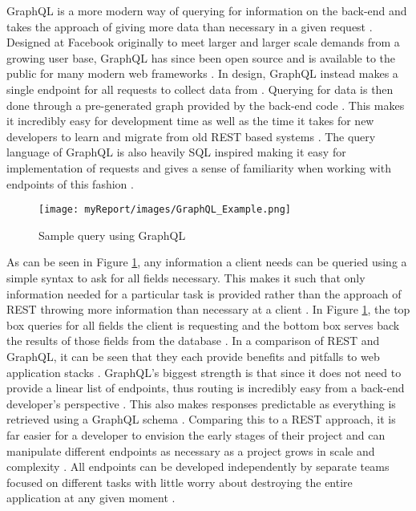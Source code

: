 \newline
GraphQL is a more modern way of querying for information on the back-end and takes the approach of giving more data than necessary in a given request \cite{Brito_Valente_2020, Stubailo_2021}. Designed at Facebook originally to meet larger and larger scale demands from a growing user base, GraphQL has since been open source and is available to the public for many modern web frameworks \cite{Abdullah_Zeki_2014}. In design, GraphQL instead makes a single endpoint for all requests to collect data from \cite{Brito_Mombach_Valente_2019, Brito_Valente_2020}.  Querying for data is then done through a pre-generated graph provided by the back-end code \cite{Brito_Mombach_Valente_2019}.  This makes it incredibly easy for development time as well as the time it takes for new developers to learn and migrate from old REST based systems \cite{Hartig_Pérez_2018}.  The query language of GraphQL is also heavily SQL inspired making it easy for implementation of requests and gives a sense of familiarity when working with endpoints of this fashion \cite{Brito_Mombach_Valente_2019}.

\begin{figure}[H]
\centering
\texttt{[image: myReport/images/GraphQL\_Example.png]}
\caption{Sample query using GraphQL \cite{GraphQL}}
\label{fig:graphQL_example}
\end{figure}

As can be seen in Figure \ref{fig:graphQL_example}, any information a client needs can be queried using a simple syntax to ask for all fields necessary. This makes it such that only information needed for a particular task is provided rather than the approach of REST throwing more information than necessary at a client \cite{Brito_Mombach_Valente_2019}. In Figure \ref{fig:graphQL_example}, the top box queries for all fields the client is requesting and the bottom box serves back the results of those fields from the database \cite{GraphQL}.
\newline
\newline
In a comparison of REST and GraphQL, it can be seen that they each provide benefits and pitfalls to web application stacks \cite{Stubailo_2021}.  GraphQL’s biggest strength is that since it does not need to provide a linear list of endpoints, thus routing is incredibly easy from a back-end developer’s perspective \cite{Stubailo_2021}. This also makes responses predictable as everything is retrieved using a GraphQL schema \cite{Brito_Mombach_Valente_2019, Stubailo_2021}. Comparing this to a REST approach, it is far easier for a developer to envision the early stages of their project and can manipulate different endpoints as necessary as a project grows in scale and complexity \cite{Stubailo_2021}. All endpoints can be developed independently by separate teams focused on different tasks with little worry about destroying the entire application at any given moment \cite{Brito_Mombach_Valente_2019, GraphQL, Stubailo_2021}.

